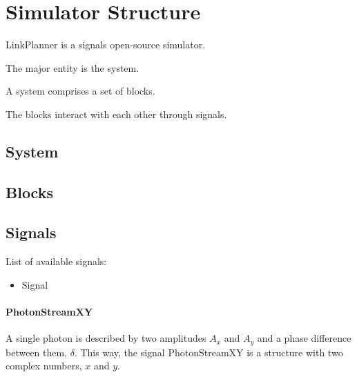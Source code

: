 
\chapter{Simulator Structure}

LinkPlanner is a signals open-source simulator.

The major entity is the system.

A system comprises a set of blocks.

The blocks interact with each other through signals.

\section{System}

\section{Blocks}

\section{Signals}

List of available signals:

\begin{itemize}
    \item Signal

\end{itemize}

\subsubsection{PhotonStreamXY}
A single photon is described by two amplitudes $A_x$ and $A_y$ and a phase difference between them, $\delta$. This way, the signal PhotonStreamXY is a structure with two complex numbers, $x$ and $y$.


